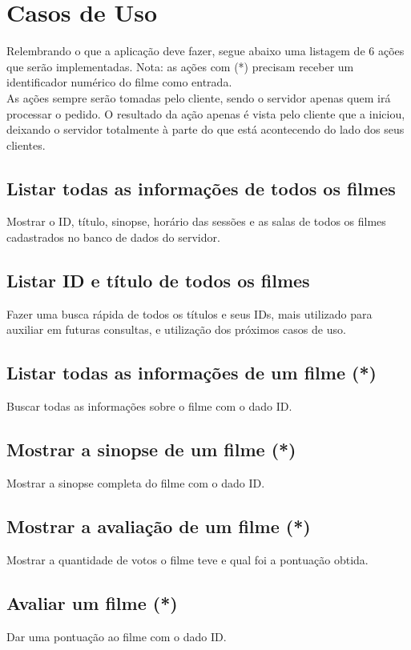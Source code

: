 \documentclass[11pt,twoside]{article}
\begin{document}
\section{Casos de Uso}

Relembrando o que a aplicação deve fazer, segue abaixo uma listagem de 6 ações que serão implementadas. Nota: as ações com (*) precisam receber um identificador numérico do filme como entrada.\\
As ações sempre serão tomadas pelo cliente, sendo o servidor apenas quem irá processar o pedido. O resultado da ação apenas é vista pelo cliente que a iniciou, deixando o servidor totalmente à parte do que está acontecendo do lado dos seus clientes.
\subsection{Listar todas as informações de todos os filmes}
Mostrar o ID, título, sinopse, horário das sessões e as salas de todos os filmes cadastrados no banco de dados do servidor.
\subsection{Listar ID e título de todos os filmes}
Fazer uma busca rápida de todos os títulos e seus IDs, mais utilizado para auxiliar em futuras consultas, e utilização dos próximos casos de uso.
\subsection{Listar todas as informações de um filme (*)}
Buscar todas as informações sobre o filme com o dado ID.
\subsection{Mostrar a sinopse de um filme (*)}
Mostrar a sinopse completa do filme com o dado ID.
\subsection{Mostrar a avaliação de um filme (*)}
Mostrar a quantidade de votos o filme teve e qual foi a pontuação obtida.
\subsection{Avaliar um filme (*)}
Dar uma pontuação ao filme com o dado ID.
\end{document}
